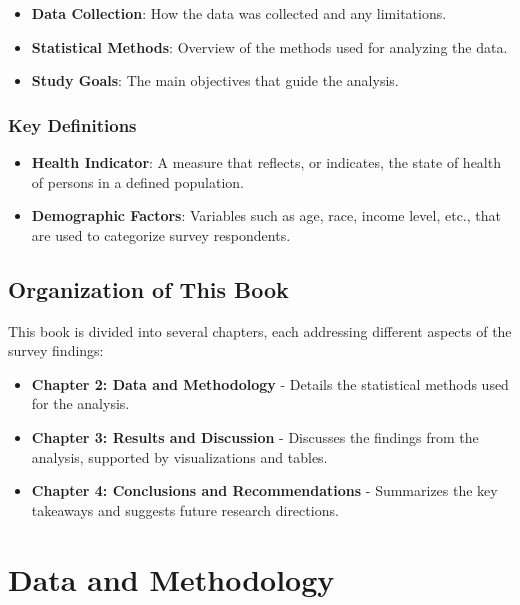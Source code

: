 \documentclass[
]{book}
\providecommand{\tightlist}{%
  \setlength{\itemsep}{0pt}\setlength{\parskip}{0pt}}
\begin{document}
\begin{itemize}
\tightlist
\item
  \textbf{Data Collection}: How the data was collected and any limitations.
\item
  \textbf{Statistical Methods}: Overview of the methods used for analyzing the data.
\item
  \textbf{Study Goals}: The main objectives that guide the analysis.
\end{itemize}

\subsection*{Key Definitions}\label{key-definitions}

\begin{itemize}
\tightlist
\item
  \textbf{Health Indicator}: A measure that reflects, or indicates, the state of health of persons in a defined population.
\item
  \textbf{Demographic Factors}: Variables such as age, race, income level, etc., that are used to categorize survey respondents.
\end{itemize}

\section{Organization of This Book}\label{organization-of-this-book}

This book is divided into several chapters, each addressing different aspects of the survey findings:

\begin{itemize}
\tightlist
\item
  \textbf{Chapter 2: Data and Methodology} - Details the statistical methods used for the analysis.
\item
  \textbf{Chapter 3: Results and Discussion} - Discusses the findings from the analysis, supported by visualizations and tables.
\item
  \textbf{Chapter 4: Conclusions and Recommendations} - Summarizes the key takeaways and suggests future research directions.
\end{itemize}

\chapter{Data and Methodology}\label{data-and-methodology}
\end{document}
